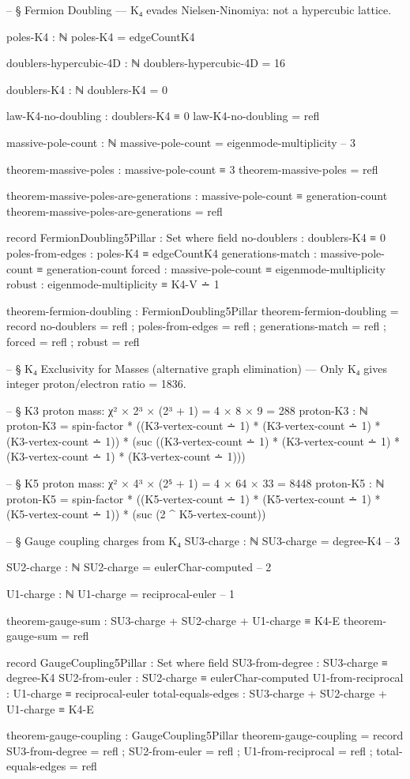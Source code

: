 \documentclass[11pt,a4paper]{book}
\begin{document}
\begin{code}
-- § Fermion Doubling — K₄ evades Nielsen-Ninomiya: not a hypercubic lattice.

poles-K4 : ℕ
poles-K4 = edgeCountK4

doublers-hypercubic-4D : ℕ
doublers-hypercubic-4D = 16

doublers-K4 : ℕ
doublers-K4 = 0

law-K4-no-doubling : doublers-K4 ≡ 0
law-K4-no-doubling = refl

massive-pole-count : ℕ
massive-pole-count = eigenmode-multiplicity  -- 3

theorem-massive-poles : massive-pole-count ≡ 3
theorem-massive-poles = refl

theorem-massive-poles-are-generations : massive-pole-count ≡ generation-count
theorem-massive-poles-are-generations = refl

record FermionDoubling5Pillar : Set where
  field
    no-doublers : doublers-K4 ≡ 0
    poles-from-edges : poles-K4 ≡ edgeCountK4
    generations-match : massive-pole-count ≡ generation-count
    forced : massive-pole-count ≡ eigenmode-multiplicity
    robust : eigenmode-multiplicity ≡ K4-V ∸ 1

theorem-fermion-doubling : FermionDoubling5Pillar
theorem-fermion-doubling = record
  { no-doublers = refl
  ; poles-from-edges = refl
  ; generations-match = refl
  ; forced = refl
  ; robust = refl }

-- § K₄ Exclusivity for Masses (alternative graph elimination) — Only K₄ gives integer proton/electron ratio = 1836.

-- § K3 proton mass: χ² × 2³ × (2³ + 1) = 4 × 8 × 9 = 288
proton-K3 : ℕ
proton-K3 = spin-factor * ((K3-vertex-count ∸ 1) * (K3-vertex-count ∸ 1) * (K3-vertex-count ∸ 1)) * (suc ((K3-vertex-count ∸ 1) * (K3-vertex-count ∸ 1) * (K3-vertex-count ∸ 1) * (K3-vertex-count ∸ 1)))

-- § K5 proton mass: χ² × 4³ × (2⁵ + 1) = 4 × 64 × 33 = 8448
proton-K5 : ℕ
proton-K5 = spin-factor * ((K5-vertex-count ∸ 1) * (K5-vertex-count ∸ 1) * (K5-vertex-count ∸ 1)) * (suc (2 ^ K5-vertex-count))

-- § Gauge coupling charges from K₄
SU3-charge : ℕ
SU3-charge = degree-K4  -- 3

SU2-charge : ℕ
SU2-charge = eulerChar-computed  -- 2

U1-charge : ℕ
U1-charge = reciprocal-euler  -- 1

theorem-gauge-sum : SU3-charge + SU2-charge + U1-charge ≡ K4-E
theorem-gauge-sum = refl

record GaugeCoupling5Pillar : Set where
  field
    SU3-from-degree : SU3-charge ≡ degree-K4
    SU2-from-euler : SU2-charge ≡ eulerChar-computed
    U1-from-reciprocal : U1-charge ≡ reciprocal-euler
    total-equals-edges : SU3-charge + SU2-charge + U1-charge ≡ K4-E

theorem-gauge-coupling : GaugeCoupling5Pillar
theorem-gauge-coupling = record
  { SU3-from-degree = refl
  ; SU2-from-euler = refl
  ; U1-from-reciprocal = refl
  ; total-equals-edges = refl }
\end{code}
\end{document}
